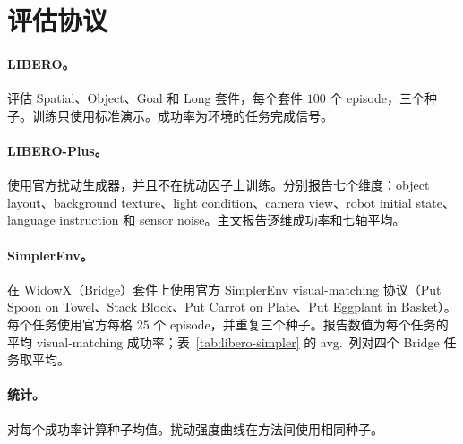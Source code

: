 \section{评估协议}
\label{app:eval}

\paragraph{LIBERO。}
评估 Spatial、Object、Goal 和 Long 套件，每个套件 $100$ 个 episode，三个种子。训练只使用标准演示。成功率为环境的任务完成信号。

\paragraph{LIBERO-Plus。}
使用官方扰动生成器，并且不在扰动因子上训练。分别报告七个维度：object layout、background texture、light condition、camera view、robot initial state、language instruction 和 sensor noise。主文报告逐维成功率和七轴平均。

\paragraph{SimplerEnv。}
在 WidowX（Bridge）套件上使用官方 SimplerEnv visual-matching 协议（Put Spoon on Towel、Stack Block、Put Carrot on Plate、Put Eggplant in Basket）。每个任务使用官方每格 $25$ 个 episode，并重复三个种子。报告数值为每个任务的平均 visual-matching 成功率；表~\ref{tab:libero-simpler} 的 avg.\ 列对四个 Bridge 任务取平均。

\paragraph{统计。}
对每个成功率计算种子均值。扰动强度曲线在方法间使用相同种子。

